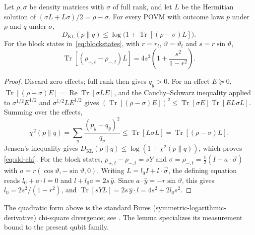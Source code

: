 \begin{lemma}
\label{lem:sld-chi}
Let $\rho,\sigma$ be density matrices with $\sigma$ of full rank, and let
$L$ be the Hermitian solution of $(\sigma L+L\sigma)/2=\rho-\sigma$. For
every POVM with outcome laws $p$ under $\rho$ and $q$ under $\sigma$,
\begin{equation}
D_{\mathrm{KL}}(p\|q)\le \log\bigl(1+\operatorname{Tr}[(\rho-\sigma)L]\bigr).
\label{eq:sld-chi}
\end{equation}
For the block states in~\eqref{eq:blockstates}, with $r=r_t$, $\vartheta=\vartheta_t$ and
$s=r\sin\vartheta$,
\begin{equation}
\operatorname{Tr}[(\rho_{+,t}-\rho_{-,t})L]
=4s^2\left(1+\frac{s^2}{1-r^2}\right).
\label{eq:sld-value}
\end{equation}
\end{lemma}

\begin{proof}
Discard zero effects; full rank then gives $q_y>0$. For an effect $E\succeq 0$,
$\operatorname{Tr}[(\rho-\sigma)E]=\operatorname{Re}\operatorname{Tr}[\sigma LE]$,
and the Cauchy--Schwarz inequality applied to
$\sigma^{1/2}E^{1/2}$ and $\sigma^{1/2}LE^{1/2}$ gives
$(\operatorname{Tr}[(\rho-\sigma)E])^2\le
\operatorname{Tr}[\sigma E]\operatorname{Tr}[EL\sigma L]$.
Summing over the effects,
\[
\chi^2(p\|q)=\sum_y\frac{(p_y-q_y)^2}{q_y}\le
\operatorname{Tr}[L\sigma L]=\operatorname{Tr}[(\rho-\sigma)L].
\]
Jensen's inequality gives $D_{\mathrm{KL}}(p\|q)\le\log(1+\chi^2(p\|q))$,
which proves \eqref{eq:sld-chi}.
For the block states, $\rho_{+,t}-\rho_{-,t}=sY$ and
$\sigma=\rho_{-,t}=\tfrac12(I+a\cdot\vec\sigma)$ with
$a=r(\cos\vartheta,-\sin\vartheta,0)$. Writing $L=l_0I+l\cdot\vec\sigma$,
the defining equation reads $l_0+a\cdot l=0$ and $l+l_0a=2s\,\hat y$.
Since $a\cdot\hat y=-r\sin\vartheta$, this gives $l_0=2s^2/(1-r^2)$, and
$\operatorname{Tr}[sY L]=2s\,\hat y\cdot l=4s^2+2l_0s^2$.
\end{proof}

The quadratic form above is the standard Bures (symmetric-logarithmic-derivative)
chi-square divergence; see \citet[Definition 2.26, Eq.~(33)]{flammia2024}. The lemma
specializes its measurement bound to the present qubit family.

